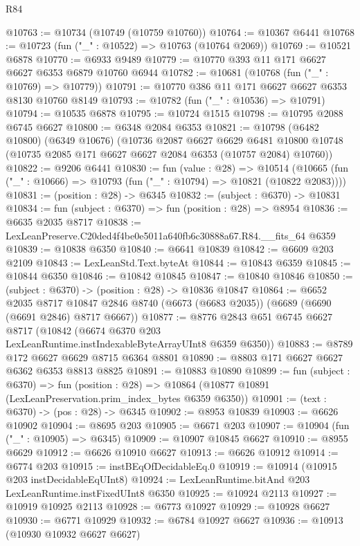 \begin{lexlean}{R84}
\begin{coremodule}
@10763 := @10734 (@10749 (@10759 @10760))
@10764 := @10367 @6441
@10768 := @10723 (fun ("_" : @10522) => @10763 (@10764 @2069))
@10769 := @10521 @6878
@10770 := @6933 @9489
@10779 := @10770 @393 @11 @171 @6627 @6627 @6353 @6879 @10760 @6944
@10782 := @10681 (@10768 (fun ("_" : @10769) => @10779))
@10791 := @10770 @386 @11 @171 @6627 @6627 @6353 @8130 @10760 @8149
@10793 := @10782 (fun ("_" : @10536) => @10791)
@10794 := @10535 @6878
@10795 := @10724 @1515
@10798 := @10795 @2088 @6745 @6627
@10800 := @6348 @2084 @6353
@10821 := @10798
    (@6482 @10800)
    (@6349 @10676)
    (@10736
      @2087
      @6627
      @6629
      @6481
      @10800
      @10748
      (@10735 @2085 @171 @6627 @6627 @2084 @6353 (@10757 @2084) @10760))
@10822 := @9206 @6441
@10830 := fun (value : @28) =>
  @10514 (@10665 (fun ("_" : @10666) => @10793 (fun ("_" : @10794) => @10821 (@10822 @2083))))
@10831 := (position : @28) -> @6345
@10832 := (subject : @6370) -> @10831
@10834 := fun (subject : @6370) => fun (position : @28) => @8954
@10836 := @6635 @2035 @8717
@10838 := LexLeanPreserve.C20ded4f4be0e5011a640fb6c30888a67.R84.__fits_64 @6359
@10839 := @10838 @6350
@10840 := @6641 @10839
@10842 := @6609 @203 @2109
@10843 := LexLeanStd.Text.byteAt
@10844 := @10843 @6359
@10845 := @10844 @6350
@10846 := @10842 @10845
@10847 := @10840 @10846
@10850 := (subject : @6370) -> (position : @28) -> @10836 @10847
@10864 := @6652
    @2035
    @8717
    @10847
    @2846
    @8740
    (@6673 (@6683 @2035))
    (@6689 (@6690 (@6691 @2846) @8717 @6667))
@10877 := @8776
    @2843
    @651
    @6745
    @6627
    @8717
    (@10842 (@6674 @6370 @203 LexLeanRuntime.instIndexableByteArrayUInt8 @6359 @6350))
@10883 := @8789 @172 @6627 @6629 @8715 @6364 @8801
@10890 := @8803 @171 @6627 @6627 @6362 @6353 @8813 @8825
@10891 := @10883 @10890
@10899 := fun (subject : @6370) =>
  fun (position : @28) => @10864 (@10877 @10891 (LexLeanPreservation.prim_index_bytes @6359 @6350))
@10901 := (text : @6370) -> (pos : @28) -> @6345
@10902 := @8953 @10839
@10903 := @6626 @10902
@10904 := @8695 @203
@10905 := @6671 @203
@10907 := @10904 (fun ("_" : @10905) => @6345)
@10909 := @10907 @10845 @6627
@10910 := @8955 @6629
@10912 := @6626 @10910 @6627
@10913 := @6626 @10912
@10914 := @6774 @203
@10915 := instBEqOfDecidableEq.{0}
@10919 := @10914 (@10915 @203 instDecidableEqUInt8)
@10924 := LexLeanRuntime.bitAnd @203 LexLeanRuntime.instFixedUInt8 @6350
@10925 := @10924 @2113
@10927 := @10919 @10925 @2113
@10928 := @6773 @10927
@10929 := @10928 @6627
@10930 := @6771 @10929
@10932 := @6784 @10927 @6627
@10936 := @10913 (@10930 @10932 @6627 @6627)

\end{coremodule}
\end{lexlean}

